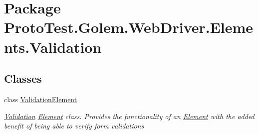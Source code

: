 \hypertarget{namespace_proto_test_1_1_golem_1_1_web_driver_1_1_elements_1_1_validation}{\section{Package Proto\-Test.\-Golem.\-Web\-Driver.\-Elements.\-Validation}
\label{namespace_proto_test_1_1_golem_1_1_web_driver_1_1_elements_1_1_validation}
}
\subsection*{Classes}
\begin{DoxyCompactItemize}
\item 
class \hyperlink{class_proto_test_1_1_golem_1_1_web_driver_1_1_elements_1_1_validation_1_1_validation_element}{Validation\-Element}
\begin{DoxyCompactList}\small\item\em \hyperlink{namespace_proto_test_1_1_golem_1_1_web_driver_1_1_elements_1_1_validation}{Validation} \hyperlink{class_proto_test_1_1_golem_1_1_web_driver_1_1_element}{Element} class. Provides the functionality of an \hyperlink{class_proto_test_1_1_golem_1_1_web_driver_1_1_element}{Element} with the added benefit of being able to verify form validations \end{DoxyCompactList}\end{DoxyCompactItemize}
